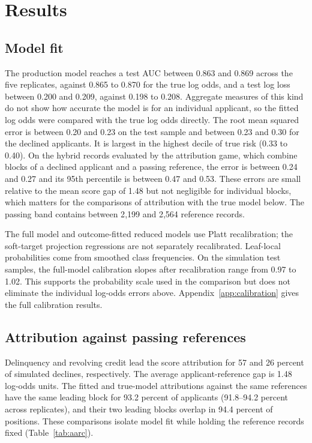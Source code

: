 \section{Results}\label{sec:results}

\subsection{Model fit}

The production model reaches a test AUC between 0.863 and 0.869 across the five replicates, against 0.865 to 0.870 for the true log odds, and a test log loss between 0.200 and 0.209, against 0.198 to 0.208. Aggregate measures of this kind do not show how accurate the model is for an individual applicant, so the fitted log odds were compared with the true log odds directly. The root mean squared error is between 0.20 and 0.23 on the test sample and between 0.23 and 0.30 for the declined applicants. It is largest in the highest decile of true risk (0.33 to 0.40). On the hybrid records evaluated by the attribution game, which combine blocks of a declined applicant and a passing reference, the error is between 0.24 and 0.27 and its 95th percentile is between 0.47 and 0.53. These errors are small relative to the mean score gap of 1.48 but not negligible for individual blocks, which matters for the comparisons of attribution with the true model below. The passing band contains between 2{,}199 and 2{,}564 reference records.

The full model and outcome-fitted reduced models use Platt recalibration; the soft-target projection regressions are not separately recalibrated. Leaf-local probabilities come from smoothed class frequencies. On the simulation test samples, the full-model calibration slopes after recalibration range from 0.97 to 1.02. This supports the probability scale used in the comparison but does not eliminate the individual log-odds errors above. Appendix~\ref{app:calibration} gives the full calibration results.






\subsection{Attribution against passing references}\label{sec:case}

Delinquency and revolving credit lead the score attribution for 57 and 26 percent of simulated declines, respectively. The average applicant-reference gap is 1.48 log-odds units. The fitted and true-model attributions against the same references have the same leading block for 93.2 percent of applicants (91.8--94.2 percent across replicates), and their two leading blocks overlap in 94.4 percent of positions. These comparisons isolate model fit while holding the reference records fixed (Table~\ref{tab:aarc}).

